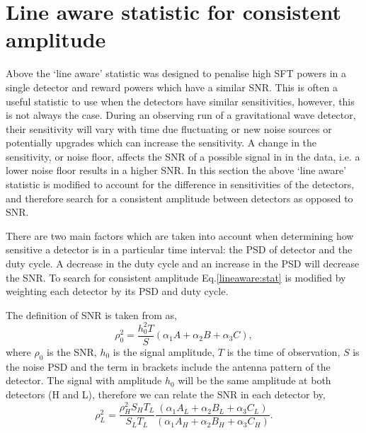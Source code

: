 \section{\label{viterbi:lineaware}Line aware statistic for consistent amplitude}


Above the `line aware' statistic was designed to penalise high \ac{SFT} powers in a single detector and reward powers which have a similar \ac{SNR}. This is often a useful statistic to use when the detectors have similar sensitivities, however, this is not always the case. During an observing run of a gravitational wave detector, their sensitivity will vary with time due fluctuating or new noise sources or potentially upgrades which can increase the sensitivity. A change in the sensitivity, or noise floor, affects the \ac{SNR} of a possible signal in in the data, i.e. a lower noise floor results in a higher \ac{SNR}. 
In this section the above `line aware' statistic is modified to account for the difference in sensitivities of the detectors, and therefore search for a consistent amplitude between detectors as opposed to \ac{SNR}.

There are two main factors which are taken into account when determining how sensitive a detector is in a particular time interval: the \ac{PSD} of detector and the duty cycle. A decrease in the duty cycle and an increase in the \ac{PSD} will decrease the \ac{SNR}. To search for consistent amplitude Eq.\ref{lineaware:stat} is modified by weighting each detector by its \ac{PSD} and duty cycle.

The definition of \ac{SNR} is taken from \cite{} as, 
\begin{equation}
    \rho_0^2 = \frac{h_0^2 T}{S}(\alpha_1A + \alpha_2B + \alpha_3C),
\end{equation}
where $\rho_0$ is the \ac{SNR}, $h_0$ is the signal amplitude, $T$ is the time of observation, $S$ is the noise \ac{PSD} and the term in brackets include the antenna pattern of the detector. 
The signal with amplitude $h_0$ will be the same amplitude at both detectors (H and L), therefore we can relate the \ac{SNR} in each detector by,
\begin{equation}
\label{lineawareamp:snrequate}
    \rho_L^2 = \frac{\rho_H^2 S_H T_L}{S_L T_L} \frac{(\alpha_1A_L + \alpha_2B_L + \alpha_3C_L)}{(\alpha_1A_H + \alpha_2B_H + \alpha_3C_H)} .
\end{equation}

